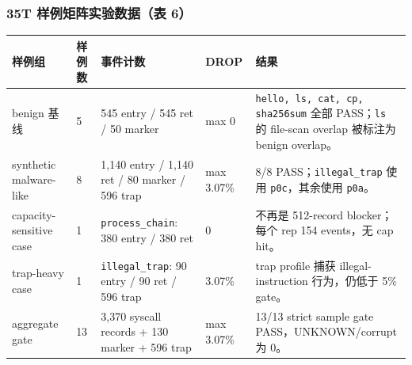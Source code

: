 \documentclass[aspectratio=169,10pt]{beamer}
\begin{document}
\begin{frame}
  \frametitle{35T 样例矩阵实验数据（表 6）}
  \vskip0.05cm
  \begin{center}\tiny
  \renewcommand{\arraystretch}{1.05}
  \begin{tabularx}{0.97\linewidth}{@{}L{2.7cm}L{1.35cm}L{2.25cm}L{2.0cm}Y@{}}
    \toprule
    \textbf{样例组} & \textbf{样例数} & \textbf{事件计数} & \textbf{DROP} & \textbf{结果} \\
    \midrule
    benign 基线 & 5 & 545 entry / 545 ret / 50 marker & max 0 & \texttt{hello, ls, cat, cp, sha256sum} 全部 PASS；\texttt{ls} 的 file-scan overlap 被标注为 benign overlap。 \\
    synthetic malware-like & 8 & 1,140 entry / 1,140 ret / 80 marker / 596 trap & max 3.07\% & 8/8 PASS；\texttt{illegal\_trap} 使用 \texttt{p0c}，其余使用 \texttt{p0a}。 \\
    capacity-sensitive case & 1 & \texttt{process\_chain}: 380 entry / 380 ret & 0 & 不再是 512-record blocker；每个 rep 154 events，无 cap hit。 \\
    trap-heavy case & 1 & \texttt{illegal\_trap}: 90 entry / 90 ret / 596 trap & 3.07\% & trap profile 捕获 illegal-instruction 行为，仍低于 5\% gate。 \\
    aggregate gate & 13 & 3,370 syscall records + 130 marker + 596 trap & max 3.07\% & 13/13 strict sample gate PASS，UNKNOWN/corrupt 为 0。 \\
    \bottomrule
  \end{tabularx}
  \end{center}
\end{frame}
\end{document}

